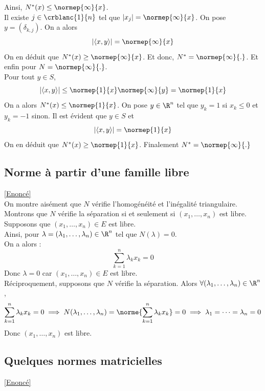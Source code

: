 \documentclass{book}
\begin{document}
\begin{enumerate}
			Ainsi, $N^*(x)\leq\normep{\infty}{x}$.\\
			Il existe $j\in\crblanc{1}{n}$ tel que $|x_j|=\normep{\infty}{x}$. On pose $y=(\delta_{k,j})$. On a alors \[|\langle x,y\rangle|=\normep{\infty}{x}\]
			On en déduit que $N^*(x)\geq \normep{\infty}{x}$. Et donc, $N^*=\normep{\infty}{.}$.
			Et enfin pour $N=\normep{\infty}{.}$.\\
			Pour tout $y\in S$, \[|\langle x,y\rangle|\leq \normep{1}{x}\normep{\infty}{y}=\normep{1}{x}\]
			On a alors $N^*(x)\leq\normep{1}{x}$. On pose $y\in \R^n$ tel que $y_k=1$ si $x_k\leq 0$ et $y_k=-1$ sinon. Il est évident que $y\in S$ et \[|\langle x,y\rangle|=\normep{1}{x}\]
			On en déduit que $N^*(x)\geq\normep{1}{x}$. Finalement $N^*=\normep{\infty}{.}$
		\end{enumerate}
	
	\subsection{Norme à partir d'une famille libre}\label{sec:norme-a-partir-dune-famille-libre}
	\textcolor{blue}{\hyperref[Norme à partir d'une famille libre]{[Enoncé]}}\\
	On montre aisément que $N$ vérifie l'homogénéité et l'inégalité triangulaire.\\
	Montrons que $N$ vérifie la séparation si et seulement si $(x_1,\dots,x_n)$ est libre.\\
	Supposons que $(x_1,\dots,x_n)\in E$ est libre.\\
	Ainsi, pour $\lambda=(\lambda_1,\dots,\lambda_n)\in\R^n$ tel que $N(\lambda)=0$.\\
	On a alors : \[\sum_{k=1}^n\lambda_kx_k=0\]
	Donc $\lambda=0$ car $(x_1,\dots,x_n)\in E$ est libre.\\
	Réciproquement, supposons que $N$ vérifie la séparation. Alors $\forall (\lambda_1,\dots,\lambda_n)\in\R^n$,
	\[\sum_{k=1}^{n}\lambda_kx_k=0 \implies N(\lambda_1,\dots,\lambda_n)=\norme{\sum_{k=1}^n\lambda_kx_k}=0\implies \lambda_1=\dots=\lambda_n=0\]
	Donc $(x_1,\dots,x_n)$ est libre.
	
	\subsection{Quelques normes matricielles}
	\label{sec:quelques-normes-matricielles}
	\textcolor{blue}{\hyperref[Quelques normes matricielles]{[Enoncé]}}\\
	
\end{document}
